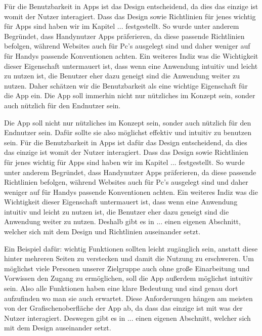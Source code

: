 \begin{itemize}
{	Für die Benutzbarkeit in Apps ist das Design entscheidend, da dies das einzige ist womit der Nutzer interagiert. Dass das Design sowie Richtlinien für jenes wichtig für Apps sind haben wir im Kapitel ... festgestellt. So wurde unter anderem Begründet, dass Handynutzer Apps präferieren\cite{}, da diese passende Richtlinien befolgen, während Websites auch für Pc's ausgelegt sind und daher weniger auf für Handys passende Konventionen achten. \newline%
	Ein weiteres Indiz was die Wichtigkeit dieser Eigenschaft untermauert ist, dass wenn eine Anwendung intuitiv und leicht zu nutzen ist, die Benutzer eher dazu geneigt sind die Anwendung weiter zu nutzen\cite{pcVsphone_peopleWillRevisitMobileIfEasyToUse}.\newline%
	Daher schätzen wir die Benutzbarkeit als eine wichtige Eigenschaft für die App ein. Die App soll immerhin nicht nur nützliches im Konzept sein, sonder auch nützlich für den Endnutzer sein.
	
	Die App soll nicht nur nützliches im Konzept sein, sonder auch nützlich für den Endnutzer sein. Dafür sollte sie also möglichst effektiv und intuitiv zu benutzen sein.\newline%
	Für die Benutzbarkeit in Apps ist dafür das Design entscheidend, da dies das einzige ist womit der Nutzer interagiert. Dass das Design sowie Richtlinien für jenes wichtig für Apps sind haben wir im Kapitel ... festgestellt. So wurde unter anderem Begründet, dass Handynutzer Apps präferieren\cite{}, da diese passende Richtlinien befolgen, während Websites auch für Pc's ausgelegt sind und daher weniger auf für Handys passende Konventionen achten. \newline%
	Ein weiteres Indiz was die Wichtigkeit dieser Eigenschaft untermauert ist, dass wenn eine Anwendung intuitiv und leicht zu nutzen ist, die Benutzer eher dazu geneigt sind die Anwendung weiter zu nutzen\cite{pcVsphone_peopleWillRevisitMobileIfEasyToUse}.\newline%
	Deshalb gibt es in ... einen eigenen Abschnitt, welcher sich mit dem Design und Richtlinien auseinander setzt. 
	
	 Ein Beispiel dafür: wichtig Funktionen sollten leicht zugänglich sein, anstatt diese hinter mehreren Seiten zu verstecken und damit die Nutzung zu erschweren.\newline%
		Um möglichst viele Personen unserer Zielgruppe auch ohne große Einarbeitung und Vorwissen den Zugang zu ermöglichen, soll die App außerdem möglichst intuitiv sein. Also alle Funktionen haben eine klare Bedeutung und sind genau dort aufzufinden wo man sie auch erwartet.\newline%
		Diese Anforderungen hängen am meisten von der Grafischenoberfläche der App ab, da dass das einzige ist mit was der Nutzer interagiert. Deswegen gibt es in ... einen eigenen Abschnitt, welcher sich mit dem Design auseinander setzt.
}%


\end{itemize}

